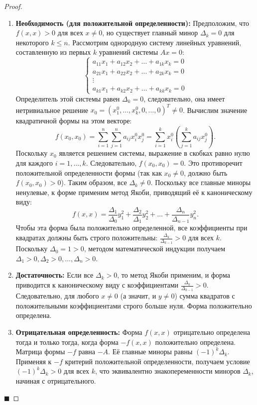 \begin{proof}
\begin{enumerate}
    \item \textbf{Необходимость (для положительной определенности):} 
    Предположим, что $f(x, x) > 0$ для всех $x \neq 0$, но существует главный минор $\Delta_k = 0$ для некоторого $k \le n$. Рассмотрим однородную систему линейных уравнений, составленную из первых $k$ уравнений системы $Ax = 0$:
    \[
    \begin{cases}
    a_{11}x_1 + a_{12}x_2 + \dots + a_{1k}x_k = 0 \\
    a_{21}x_1 + a_{22}x_2 + \dots + a_{2k}x_k = 0 \\
    \vdots \\
    a_{k1}x_1 + a_{k2}x_2 + \dots + a_{kk}x_k = 0
    \end{cases}
    \]
    Определитель этой системы равен $\Delta_k = 0$, следовательно, она имеет нетривиальное решение $x_0 = (x_1^0, \dots, x_k^0, 0, \dots, 0)^T \neq 0$. 
    Вычислим значение квадратичной формы на этом векторе:
    \[
    f(x_0, x_0) = \sum_{i=1}^n \sum_{j=1}^n a_{ij} x_i^0 x_j^0 = \sum_{i=1}^k x_i^0 \left( \sum_{j=1}^k a_{ij} x_j^0 \right).
    \]
    Поскольку $x_0$ является решением системы, выражение в скобках равно нулю для каждого $i = 1, \dots, k$. Следовательно, $f(x_0, x_0) = 0$. Это противоречит положительной определенности формы (так как $x_0 \neq 0$, должно быть $f(x_0, x_0) > 0$). 
    Таким образом, все $\Delta_k \neq 0$. Поскольку все главные миноры ненулевые, к форме применим метод Якоби, приводящий её к каноническому виду:
    \[
    f(x, x) = \frac{\Delta_1}{\Delta_0} y_1^2 + \frac{\Delta_2}{\Delta_1} y_2^2 + \dots + \frac{\Delta_n}{\Delta_{n-1}} y_n^2.
    \]
    Чтобы эта форма была положительно определенной, все коэффициенты при квадратах должны быть строго положительны: $\frac{\Delta_k}{\Delta_{k-1}} > 0$ для всех $k$. Поскольку $\Delta_0 = 1 > 0$, методом математической индукции получаем $\Delta_1 > 0, \Delta_2 > 0, \dots, \Delta_n > 0$.

    \item \textbf{Достаточность:} 
    Если все $\Delta_k > 0$, то метод Якоби применим, и форма приводится к каноническому виду с коэффициентами $\frac{\Delta_k}{\Delta_{k-1}} > 0$. Следовательно, для любого $x \neq 0$ (а значит, и $y \neq 0$) сумма квадратов с положительными коэффициентами строго больше нуля. Форма положительно определена.

    \item \textbf{Отрицательная определенность:} 
    Форма $f(x, x)$ отрицательно определена тогда и только тогда, когда форма $-f(x, x)$ положительно определена. Матрица формы $-f$ равна $-A$. Её главные миноры равны $(-1)^k \Delta_k$. Применяя к $-f$ критерий положительной определенности, получаем условие $(-1)^k \Delta_k > 0$ для всех $k$, что эквивалентно знакопеременности миноров $\Delta_k$, начиная с отрицательного.
\end{enumerate}
\hfill$\blacksquare$
\end{proof}

